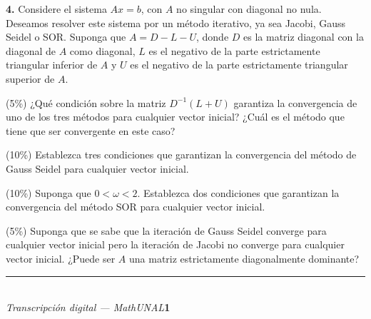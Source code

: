 \documentclass[11pt]{article}
\providecommand{\nota}[1]{\par\smallskip\noindent{\small\itshape\color{unalblue}#1}\par\smallskip}
\begin{document}
\nota{Ayuda: $\begin{bmatrix} 1 & 0 \\ -s & 1 \end{bmatrix}^{-1}=\begin{bmatrix} 1 & 0 \\ s & 1 \end{bmatrix}$.}

\vspace{5mm}
\noindent\textbf{4.} Considere el sistema $Ax=b$, con $A$ no singular con diagonal no nula. Deseamos resolver este sistema por un método iterativo, ya sea Jacobi, Gauss Seidel o SOR. Suponga que $A=D-L-U$, donde $D$ es la matriz diagonal con la diagonal de $A$ como diagonal, $L$ es el negativo de la parte estrictamente triangular inferior de $A$ y $U$ es el negativo de la parte estrictamente triangular superior de $A$.
\begin{opciones}
\item (5\%) ¿Qué condición sobre la matriz $D^{-1}(L+U)$ garantiza la convergencia de uno de los tres métodos para cualquier vector inicial? ¿Cuál es el método que tiene que ser convergente en este caso?
\item (10\%) Establezca tres condiciones que garantizan la convergencia del método de Gauss Seidel para cualquier vector inicial.
\item (10\%) Suponga que $0<\omega<2$. Establezca dos condiciones que garantizan la convergencia del método SOR para cualquier vector inicial.
\item (5\%) Suponga que se sabe que la iteración de Gauss Seidel converge para cualquier vector inicial pero la iteración de Jacobi no converge para cualquier vector inicial. ¿Puede ser $A$ una matriz estrictamente diagonalmente dominante?
\end{opciones}

\vfill
\rule{\linewidth}{0.4pt}\\[1pt]
{\scriptsize\textit{Transcripción digital --- MathUNAL}\hfill\textcolor{unalblue}{\textbf{1}}}
\end{document}
